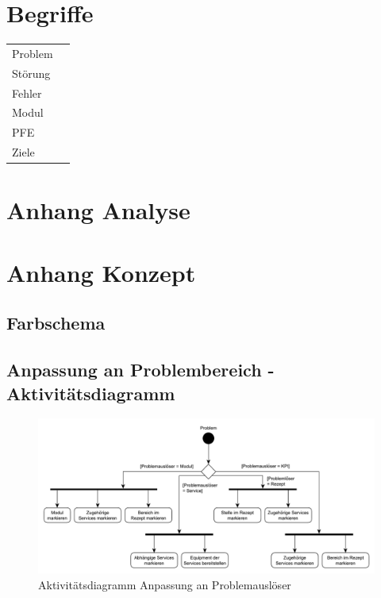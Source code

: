 \chapter{Begriffe}

\begin{table}[htbp]
\begin{tabular}{ll}
Problem & \\
Störung & \\
Fehler & \\
Modul & \\
PFE & \\
Ziele & \\
\end{tabular}
\end{table}

\chapter{Anhang Analyse}


\chapter{Anhang Konzept}
\section{Farbschema}

\section{Anpassung an Problembereich - Aktivitätsdiagramm}

\begin{figure}[htbp]
\centering
\includegraphics[angle=90,scale=0.6]{DA_files/UML/Anhang/Aktivitaetsdiagramm-Problem.pdf}
\caption{Aktivitätsdiagramm Anpassung an Problemauslöser}
\end{figure}

